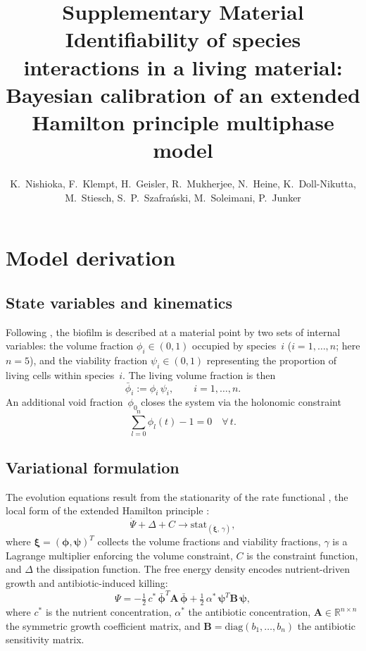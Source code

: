 \documentclass[11pt,a4paper]{article}
\title{Supplementary Material\\[4pt]
\large Identifiability of species interactions in a living material: Bayesian calibration of an extended Hamilton principle multiphase model}
\author{K.~Nishioka, F.~Klempt, H.~Geisler, R.~Mukherjee, N.~Heine, K.~Doll-Nikutta,\\ M.~Stiesch, S.~P.~Szafra\'{n}ski, M.~Soleimani, P.~Junker}
\date{}
\newcommand{\bphi}{\boldsymbol{\phi}}
\newcommand{\bpsi}{\boldsymbol{\psi}}
\newcommand{\Real}{\mathbb{R}}
\begin{document}
\maketitle

\section{Model derivation}
\label{sec:S_model}

\subsection*{State variables and kinematics}

Following \citet{Klempt2025ContinuumBiofilm, Klempt2024ContinuumGrowth}, the biofilm is described at a material point by two sets of internal variables: the volume fraction $\phi_i \in (0,1)$ occupied by species~$i$ ($i=1,\dots,n$; here $n=5$), and the viability fraction $\psi_i \in (0,1)$ representing the proportion of living cells within species~$i$.
The living volume fraction is then
\begin{equation}
\bar{\phi}_i := \phi_i\,\psi_i,
\qquad i=1,\dots,n.
\label{eq:living}
\end{equation}
An additional void fraction~$\phi_0$ closes the system via the holonomic constraint
\begin{equation}
\sum_{l=0}^{n}\phi_l(t) - 1 = 0 \quad\forall\,t.
\label{eq:constraint}
\end{equation}



\subsection*{Variational formulation}
The evolution equations result from the stationarity of the rate functional \citep{junker2014principle, hackl1997generalized}, the local form of the extended Hamilton principle \citep{JunkerBalzani2021ExtendedHamilton, JunkerBodeHackl2025Holistic}:
\begin{equation}
    \dot{\Psi} + \Delta + C \rightarrow \mathrm{stat}_{(\dot{\boldsymbol{\xi}}, \, \gamma)},
    \label{eq:variational_local}
\end{equation}
where $\boldsymbol{\xi} = (\boldsymbol{\phi}, \boldsymbol{\psi})^T$ collects the volume fractions and viability fractions, $\gamma$ is a Lagrange multiplier enforcing the volume constraint, $C$ is the constraint function, and $\Delta$ the dissipation function. The free energy density encodes nutrient-driven growth and antibiotic-induced killing:
\begin{equation}
\Psi = -\tfrac{1}{2}\,c^*\,\bar{\bphi}^T \mathbf{A}\,\bar{\bphi}
      + \tfrac{1}{2}\,\alpha^*\,\bpsi^T \mathbf{B}\,\bpsi,
\label{eq:psi}
\end{equation}
where $c^*$ is the nutrient concentration, $\alpha^*$ the antibiotic concentration, $\mathbf{A}\in\Real^{n\times n}$ the symmetric growth coefficient matrix, and $\mathbf{B}=\mathrm{diag}(b_1,\dots,b_n)$ the antibiotic sensitivity matrix.
\end{document}
